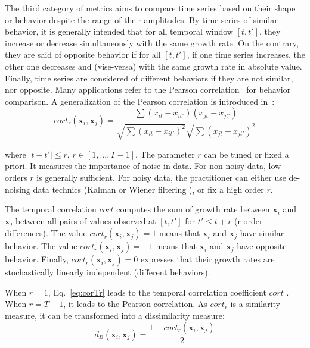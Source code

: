 The third category of metrics aims to compare time series based on their shape or behavior despite the range of their amplitudes. By time series of similar behavior, it is generally intended that for all temporal window $[t,t']$, they increase or decrease simultaneously with the same growth rate. On the contrary, they are said of opposite behavior if for all $[t,t']$, if one time series increases, the other one decreases and (vise-versa) with the same growth rate in absolute value. Finally, time series are considered of different behaviors if they are not similar, nor opposite. Many applications refer to the Pearson correlation~\cite{Abraham2010a,Benesty2009} for behavior comparison. A generalization of the Pearson correlation is introduced in~\cite{AhlameDouzal-Chouakria2011}: 
\begin{equation}	
	cort_r(\textbf{x}_i,\textbf{x}_j) = 
	\frac{
		\sum 
		{
			(x_{it}-x_{it'})
			(x_{jt}-x_{jt'})
		}
	}
	{
		\sqrt{
			\sum 
			{(x_{it}-x_{it'})^2}
		} 
		\sqrt{
			\sum 
			{(x_{jt}-x_{jt'})^2}
		} 	 
	}
\label{eq:corTr}
\end{equation}

\noindent where $|t-t'| \leq r$, $r \in [1,..., T-1]$. The parameter $r$ can be tuned or fixed a priori. It measures the importance of noise in data. For non-noisy data, low orders $r$ is generally sufficient. For noisy data, the practitioner can either use de-noising data technics (Kalman or Wiener filtering \cite{Kalman1960,WienerN1942}), or fix a high order $r$.

The temporal correlation $cort$ computes the sum of growth rate between $\textbf{x}_i$ and $\textbf{x}_j$ between all pairs of values observed at $[t ,t']$ for $t' \leq t+r$ (r-order differences). The value $cort_r(\textbf{x}_i,\textbf{x}_j) = 1$ means that $\textbf{x}_i$ and $\textbf{x}_j$  have similar behavior. The value $cort_r(\textbf{x}_i,\textbf{x}_j) = -1$ means that $\textbf{x}_i$ and $\textbf{x}_j$ have opposite behavior. Finally, $cort_r(\textbf{x}_i,\textbf{x}_j) = 0$ expresses that their growth rates are stochastically linearly independent (different behaviors). 

When $r=1$, Eq.~\eqref{eq:corTr} leads to the temporal correlation coefficient $cort$ \cite{AhlameDouzal-Chouakria2011}. When $r=T-1$, it leads to the Pearson correlation. As $cort_r$ is a similarity measure, it can be transformed into a dissimilarity measure:
\begin{equation}
	d_B(\textbf{x}_i,\textbf{x}_j) = \frac{1 - cort_r(\textbf{x}_i,\textbf{x}_j)}{2}
	\label{eq:B}
\end{equation}

